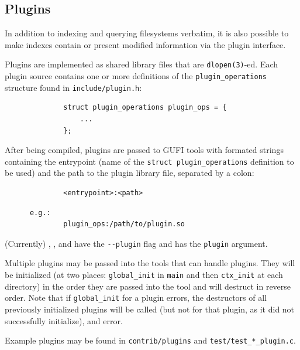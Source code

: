 \subsection{Plugins}
In addition to indexing and querying filesystems verbatim, it is also
possible to make indexes contain or present modified information via
the plugin interface.

Plugins are implemented as shared library files that are
\texttt{dlopen(3)}-ed. Each plugin source contains one or more
definitions of the \texttt{plugin\_operations} structure found in
\texttt{include/plugin.h}:

\begin{verbatim}
              struct plugin_operations plugin_ops = {
                  ...
              };
\end{verbatim}

After being compiled, plugins are passed to GUFI tools with formated
strings containing the entrypoint (name of the
\texttt{struct~plugin\_operations} definition to be used) and the path
to the plugin library file, separated by a colon:
\begin{verbatim}
              <entrypoint>:<path>
\end{verbatim}
\begin{verbatim}
      e.g.:
              plugin_ops:/path/to/plugin.so
\end{verbatim}

(Currently) \gufidirindex, \gufiquery, and \gufiincrementalupdate have
the \texttt{-{}-plugin} flag and \gufivt has the \texttt{plugin}
argument.

Multiple plugins may be passed into the tools that can handle
plugins. They will be initialized (at two places:
\texttt{global\_init} in \texttt{main} and then \texttt{ctx\_init} at
each directory) in the order they are passed into the tool and will
destruct in reverse order. Note that if \texttt{global\_init} for a
plugin errors, the destructors of all previously initialized plugins
will be called (but not for that plugin, as it did not successfully
initialize), and error.

Example plugins may be found in \texttt{contrib/plugins} and
\texttt{test/test\_*\_plugin.c}.
